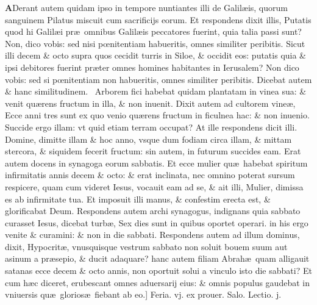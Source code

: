 \documentclass[a5paper,10pt]{book}
\def\leftmarginnote{%
	\lrmarginnote{\hskip -\marginparsep \hskip -6.5em}}
\def\ae{æ}
\def\oe{œ}
\begin{document}
\begin{multicols*}{2}
\vspace{-1.25em}
\lettrine[lines=2]{\bfseries \color{red} A}{}Derant\leftmarginnote{\begin{flushright}c. 13.\end{flushright}} autem quidam ipso in tempore nuntiantes illi de Galil\ae is, quorum sanguinem Pilatus miscuit cum sacrificijs eorum.
Et respondens dixit illis, Putatis quod hi Galil\ae i pr\ae \ omnibus Galil\ae is peccatores fuerint, quia talia passi sunt?
Non, dico vobis: sed nisi p\oe nitentiam habueritis, omnes similiter peribitis.
Sicut illi decem \& octo supra quos cecidit turris in Siloe, \& occidit eos: putatis quia \& ipsi debitores fuerint pr\ae ter omnes homines habitantes in Ierusalem?
Non dico vobis: sed si p\oe nitentiam non habueritis, omnes similiter peribitis.
Dicebat autem \& hanc similitudinem. \textdagger \ 
Arborem\leftmarginnote{\begin{flushright}B\end{flushright}} fici habebat quidam plantatam in vinea sua: \& venit qu\ae rens fructum in illa, \& non inuenit.
Dixit autem
ad cultorem vine\ae , Ecce anni tres sunt ex quo venio qu\ae rens fructum in ficulnea hac: \& non inuenio.
Succide ergo illam: vt quid etiam terram occupat?
At ille respondens dicit illi. Domine, dimitte illam \& hoc anno, vsque dum fodiam circa illam, \& mittam stercora, \& siquidem fecerit fructum: sin autem, in futurum succides eam.
\newline \indent Erat autem docens in synagoga eorum sabbatis.
Et ecce mulier qu\ae \ habebat spiritum infirmitatis annis decem \& octo: \& erat inclinata, nec omnino poterat sursum respicere, quam cum videret Iesus, vocauit eam ad se, \& ait illi, Mulier, dimissa es ab infirmitate tua.
Et imposuit illi manus, \& confestim erecta est, \& glorificabat Deum.
Respondens autem archi synagogus, indignans quia sabbato curasset Iesus, dicebat turb\ae , Sex dies sunt in quibus oportet operari. in his ergo venite \& curamini: \& non in die sabbati.
Respondens autem ad illum dominus, dixit, Hypocrit\ae , vnusquisque vestrum sabbato non soluit bouem suum aut asinum a pr\ae sepio, \& ducit adaquare?
hanc autem filiam Abrah\ae \ quam alligauit satanas ecce decem \& octo annis, non oportuit solui a vinculo isto die sabbati?
Et cum h\ae c diceret, erubescant omnes aduersarij eius: \& omnis populus gaudebat in vniuersis qu\ae \ glorios\ae \ fiebant ab eo.]
\newline \textswab{C} \color{red} \hypertarget{FRI-PRIMA-POST-ADV}{Feria. vj.} ex prouer. Salo. \hfill Lectio. j. \color{black}

\end{multicols*}
\end{document}
